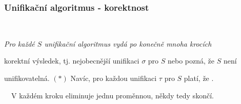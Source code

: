     
    
    \subsubsection*{Unifikační algoritmus - korektnost}
    {\bf {}}\ \ {\it Pro každé $S$ unifikační algoritmus vydá po konečně mnoha krocích
    \smallskip
    
    korektní výsledek, tj. nejobecnější unifikaci $\sigma$ pro $S$ nebo pozná, že $S$ není
    \smallskip
    
    unifikovatelná. $(*)$ Navíc, pro každou unifikaci $\tau$ pro $S$ platí, že \myblue{$\tau=\sigma\tau$}.}
    \medskip
    
    {\it {}}\ \ V každém kroku eliminuje jednu proměnnou, někdy tedy skončí.
    
